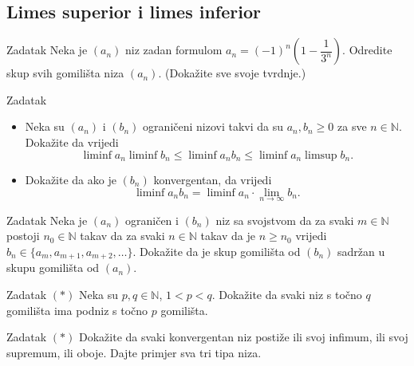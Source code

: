 \subsection*{Limes superior i limes inferior}
\begin{exercise}{Zadatak}
Neka je \((a_n)\) niz zadan formulom \(a_n=(-1)^n\left(1-\dfrac{1}{3^n}\right)\). Odredite skup svih gomilišta niza $(a_n)$. (Dokažite sve svoje tvrdnje.)
\end{exercise}
\begin{exercise}{Zadatak} \textbf{}
\begin{itemize}
\item[a)] Neka su $(a_n)$ i $(b_n)$ ograničeni nizovi takvi da su $a_n, b_n\geq 0$ za sve $n\in \mathbb{N}$. Dokažite da vrijedi
$$\liminf{a_n}\liminf{b_n}\leq \liminf{a_nb_n}\leq \liminf{a_n}\limsup{b_n}.$$
\item[b)] Dokažite da ako je $(b_n)$ konvergentan, da vrijedi
$$\liminf{a_nb_n}=\liminf{a_n}\cdot\lim\limits_{n\to \infty}{b_n}.$$
\end{itemize}
\end{exercise}
\begin{exercise}{Zadatak}
Neka je $(a_n)$ ograničen i $(b_n)$ niz sa svojstvom da za svaki $m\in \mathbb{N}$ postoji $n_0\in \mathbb{N}$ takav da za svaki $n\in \mathbb{N}$ takav da je $n\geq n_0$ vrijedi $b_n\in \{a_{m}, a_{m+1}, a_{m+2}, \dots\}$. Dokažite da je skup gomilišta od $(b_n)$ sadržan u skupu gomilišta od $(a_n)$.
\end{exercise}
\begin{exercise}{Zadatak} \((*)\)
Neka su \(p, q\in \mathbb{N}\), \(1<p<q\). Dokažite da svaki niz s točno \(q\) gomilišta ima podniz s točno \(p\) gomilišta.
\end{exercise}
\begin{exercise}{Zadatak} \((*)\)
Dokažite da svaki konvergentan niz postiže ili svoj infimum, ili svoj supremum, ili oboje. Dajte primjer sva tri tipa niza.
\end{exercise}

